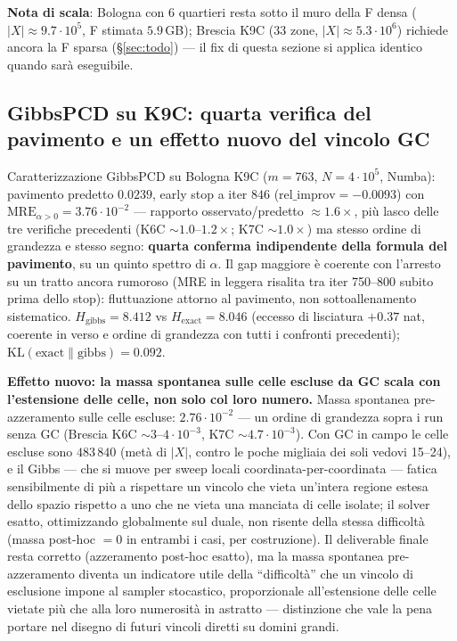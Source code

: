 \documentclass[11pt,a4paper]{article}
\begin{document}
\medskip\noindent\textbf{Nota di scala}: Bologna con $6$ quartieri
resta sotto il muro della F densa ($|X|\approx9.7\cdot10^5$, F stimata
$5.9$\,GB); Brescia K9C ($33$ zone, $|X|\approx5.3\cdot10^6$) richiede
ancora la F sparsa (\S\ref{sec:todo}) --- il fix di questa sezione si
applica identico quando sar\`a eseguibile.

\subsection{GibbsPCD su K9C: quarta verifica del pavimento e un effetto
nuovo del vincolo GC}
\label{sec:gibbs-k9c}
Caratterizzazione GibbsPCD su Bologna K9C ($m=763$, $N=4\cdot10^5$,
Numba): pavimento predetto $0.0239$, early stop a iter $846$
($\text{rel\_improv}=-0.0093$) con $\text{MRE}_{\alpha>0}=3.76\cdot10^{-2}$
--- rapporto osservato/predetto $\approx1.6\times$, pi\`u lasco delle tre
verifiche precedenti (K6C $\sim1.0$--$1.2\times$; K7C $\sim1.0\times$) ma
stesso ordine di grandezza e stesso segno: \textbf{quarta conferma
indipendente della formula del pavimento}, su un quinto spettro di
$\alpha$. Il gap maggiore \`e coerente con l'arresto su un tratto ancora
rumoroso (MRE in leggera risalita tra iter 750--800 subito prima dello
stop): fluttuazione attorno al pavimento, non sottoallenamento
sistematico. $H_{\text{gibbs}}=8.412$ vs $H_{\text{exact}}=8.046$
(eccesso di lisciatura $+0.37$ nat, coerente in verso e ordine di
grandezza con tutti i confronti precedenti);
$\mathrm{KL}(\text{exact}\|\text{gibbs})=0.092$.

\medskip\noindent\textbf{Effetto nuovo: la massa spontanea sulle celle
escluse da GC scala con l'estensione delle celle, non solo col loro
numero.} Massa spontanea pre-azzeramento sulle celle escluse:
$2.76\cdot10^{-2}$ --- un ordine di grandezza sopra i run senza GC
(Brescia K6C $\sim3$--$4\cdot10^{-3}$, K7C $\sim4.7\cdot10^{-3}$). Con GC
in campo le celle escluse sono $483\,840$ (met\`a di $|X|$, contro le
poche migliaia dei soli vedovi 15--24), e il Gibbs --- che si muove per
sweep locali coordinata-per-coordinata --- fatica sensibilmente di pi\`u
a rispettare un vincolo che vieta un'intera regione estesa dello spazio
rispetto a uno che ne vieta una manciata di celle isolate; il solver
esatto, ottimizzando globalmente sul duale, non risente della stessa
difficolt\`a (massa post-hoc $=0$ in entrambi i casi, per costruzione).
Il deliverable finale resta corretto (azzeramento post-hoc esatto), ma
la massa spontanea pre-azzeramento diventa un indicatore utile della
``difficolt\`a'' che un vincolo di esclusione impone al sampler
stocastico, proporzionale all'estensione delle celle vietate pi\`u che
alla loro numerosit\`a in astratto --- distinzione che vale la pena
portare nel disegno di futuri vincoli diretti su domini grandi.
\end{document}
